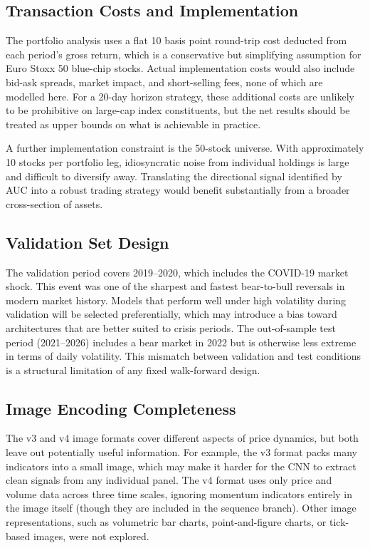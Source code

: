 \subsection{Transaction Costs and Implementation}

The portfolio analysis uses a flat 10 basis point round-trip cost deducted from each period's gross return, which is a conservative but simplifying assumption for Euro Stoxx 50 blue-chip stocks. Actual implementation costs would also include bid-ask spreads, market impact, and short-selling fees, none of which are modelled here. For a 20-day horizon strategy, these additional costs are unlikely to be prohibitive on large-cap index constituents, but the net results should be treated as upper bounds on what is achievable in practice.

A further implementation constraint is the 50-stock universe. With approximately 10 stocks per portfolio leg, idiosyncratic noise from individual holdings is large and difficult to diversify away. Translating the directional signal identified by AUC into a robust trading strategy would benefit substantially from a broader cross-section of assets.

\subsection{Validation Set Design}

The validation period covers 2019--2020, which includes the COVID-19 market shock. This event was one of the sharpest and fastest bear-to-bull reversals in modern market history. Models that perform well under high volatility during validation will be selected preferentially, which may introduce a bias toward architectures that are better suited to crisis periods. The out-of-sample test period (2021--2026) includes a bear market in 2022 but is otherwise less extreme in terms of daily volatility. This mismatch between validation and test conditions is a structural limitation of any fixed walk-forward design.

\subsection{Image Encoding Completeness}

The v3 and v4 image formats cover different aspects of price dynamics, but both leave out potentially useful information. For example, the v3 format packs many indicators into a small image, which may make it harder for the CNN to extract clean signals from any individual panel. The v4 format uses only price and volume data across three time scales, ignoring momentum indicators entirely in the image itself (though they are included in the sequence branch). Other image representations, such as volumetric bar charts, point-and-figure charts, or tick-based images, were not explored.

